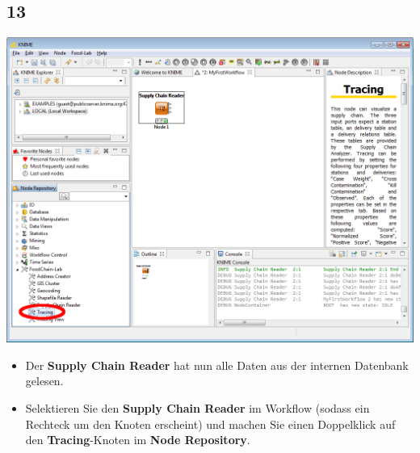 \documentclass{beamer}
\begin{document}
\subsection{13}
\begin{frame}
	\begin{center}
  		\includegraphics[height=0.6\textheight]{13.png}
	\end{center}
	\begin{itemize}
		\item Der \textbf{Supply Chain Reader} hat nun alle Daten aus der internen Datenbank gelesen.
		\item Selektieren Sie den \textbf{Supply Chain Reader} im Workflow (sodass ein Rechteck um den Knoten erscheint) und machen Sie einen Doppelklick auf den \textbf{Tracing}-Knoten im \textbf{Node Repository}.
	\end{itemize}
\end{frame}
\end{document}
